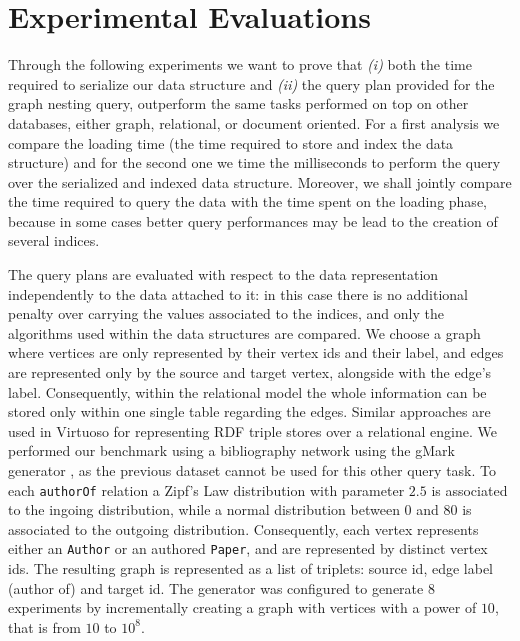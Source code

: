 \section{Experimental Evaluations}\label{sec:nestexpeval}
Through the following experiments we want to prove that \textit{(i)} both the time required to serialize our data structure and \textit{(ii)} the query plan provided for the graph nesting query,  outperform the same tasks performed on top on other databases, either graph, relational, or document oriented. For a first analysis we compare the loading time (the time required to store and index the data structure) and for the second one we time the milliseconds to perform the query  over the serialized and indexed data structure. Moreover, we shall jointly compare the time required to query the data with the time spent on the loading phase, because in some cases better query performances may be lead to the creation of several indices.


The query plans are evaluated with respect to the data representation independently to the data attached to it: in this case there is no additional penalty over carrying the values associated to the indices, and only the algorithms used within the data structures are compared. We choose a graph where vertices are only represented by their vertex ids and their label, and edges are represented only by the source and target vertex, alongside with the edge's label. Consequently, within the relational model the whole information can be stored only within one single table regarding the edges. Similar approaches are used in Virtuoso for representing RDF triple stores over a relational engine. We performed our benchmark using  a bibliography network using the gMark generator \cite{BBCFLA17}, as the previous dataset cannot be used for this other query task. To each \texttt{authorOf} relation a Zipf's Law distribution with parameter $2.5$ is associated to the ingoing distribution, while a normal distribution between $0$ and $80$ is associated to the outgoing distribution. Consequently, each vertex represents either an \texttt{Author} or an authored \texttt{Paper}, and are represented by distinct vertex ids. The resulting graph is represented as a list of triplets: source id, edge label (author of) and target id. The generator was configured to generate $8$ experiments by incrementally creating a graph with vertices with a power of $10$, that is from $10$ to $10^8$.

